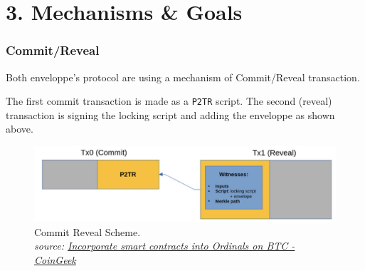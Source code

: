 \documentclass[hyperref={colorlinks=true}]{beamer}
\begin{document}










\section{3. Mechanisms \& Goals}

\begin{frame}
\frametitle{Commit/Reveal}

\begin{center}

Both enveloppe's protocol are using a mechanism of Commit/Reveal transaction. 

\vspace{1cm}

The first commit transaction is made as a \texttt{P2TR} script. The second (reveal) transaction is signing the locking script and adding the enveloppe as shown above.\\

\begin{figure}
\includegraphics[width=\textwidth]{./assets/commit_reveal.png}
\caption{Commit Reveal Scheme.\\ {\tiny \it source: \href{https://coingeek.com/incorporate-smart-contracts-into-ordinals-on-btc/}{Incorporate smart contracts into Ordinals on BTC - CoinGeek}}}
\end{figure} 

\end{center}

\end{frame}
\end{document}
